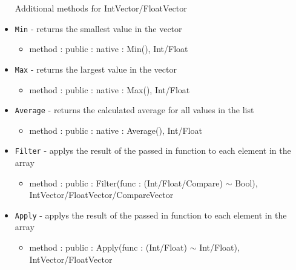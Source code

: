 \documentclass[12pt]{article}
\begin{document}
\begin{itemize}
  Additional methods for IntVector/FloatVector
\item \texttt{Min} - returns the smallest value in the vector
  \begin{itemize}
  \item method : public : native : Min(), Int/Float
  \end{itemize}
\item \texttt{Max} - returns the largest value in the vector
  \begin{itemize}
  \item method : public : native : Max(), Int/Float
  \end{itemize}
\item \texttt{Average} - returns the calculated average for all values in the list
  \begin{itemize}
  \item method : public : native : Average(), Int/Float
  \end{itemize}
\item \texttt{Filter} - applys the result of the passed in function to each element in the array 
  \begin{itemize}
  \item method : public : Filter(func : (Int/Float/Compare) $\sim$ Bool), IntVector/FloatVector/CompareVector
  \end{itemize}
\item \texttt{Apply} - applys the result of the passed in function to each element in the array 
  \begin{itemize}
  \item method : public : Apply(func : (Int/Float) $\sim$ Int/Float), IntVector/FloatVector
  \end{itemize}
\end{itemize}
\end{document}
